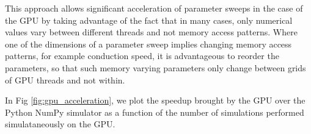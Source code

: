 	This approach allows significant acceleration of parameter sweeps in the
	case of the GPU by taking
	advantage of the fact that in many cases, only numerical values vary
	between different threads and not memory access patterns. Where one of the
	dimensions of a parameter sweep implies changing memory access patterns, 
	for example conduction speed, it is advantageous to reorder the parameters,
	so that such memory varying parameters only change between grids of GPU
	threads and not within.

	In Fig \ref{fig:gpu_acceleration}, we plot the speedup brought by the GPU
	over the Python NumPy simulator as a function of the number of simulations 
	performed simulataneously on the GPU.



